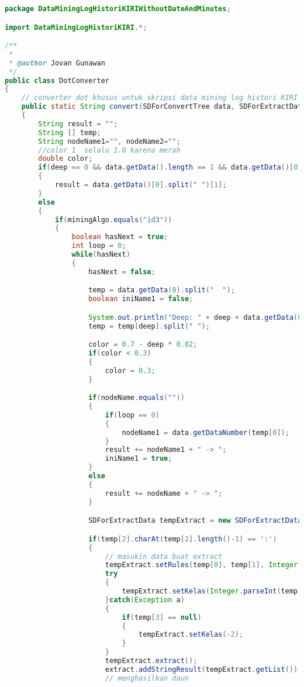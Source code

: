 \begin{lstlisting}[language=Java,basicstyle=\tiny,caption=DotConverter.java]
package DataMiningLogHistoriKIRIWithoutDateAndMinutes;

import DataMiningLogHistoriKIRI.*;

/**
 *
 * @author Jovan Gunawan
 */
public class DotConverter 
{
    // converter dot khusus untuk skripsi data mining log histori KIRI --> output berupa tree dalam string dari weka
    public static String convert(SDForConvertTree data, SDForExtractData extract, String miningAlgo, int deep, String nodeName)
    {
        String result = "";
        String [] temp;
        String nodeName1="", nodeName2="";
        //color 1  selalu 1.0 karena merah
        double color; 
        if(deep == 0 && data.getData().length == 1 && data.getData()[0].charAt(0) == ':')
        {
            result = data.getData()[0].split(" ")[1];
        }
        else
        {
            if(miningAlgo.equals("id3"))
            {
                boolean hasNext = true;
                int loop = 0;
                while(hasNext)
                {
                    hasNext = false;

                    temp = data.getData(0).split("  ");
                    boolean iniName1 = false;

                    System.out.println("Deep: " + deep + data.getData(0));
                    temp = temp[deep].split(" ");

                    color = 0.7 - deep * 0.02;
                    if(color < 0.3)
                    {
                        color = 0.3;
                    }

                    if(nodeName.equals(""))
                    {
                        if(loop == 0)
                        {
                            nodeName1 = data.getDataNumber(temp[0]);
                        }
                        result += nodeName1 + " -> ";
                        iniName1 = true;
                    }
                    else
                    {
                        result += nodeName + " -> ";
                    }

                    SDForExtractData tempExtract = new SDForExtractData(extract);

                    if(temp[2].charAt(temp[2].length()-1) == ':')
                    {
                        // masukin data buat extract
                        tempExtract.setRules(temp[0], temp[1], Integer.parseInt(temp[2].substring(0, temp[2].length()-1)));
                        try
                        {
                            tempExtract.setKelas(Integer.parseInt(temp[3]));
                        }catch(Exception a)
                        {
                            if(temp[3] == null)
                            {
                                tempExtract.setKelas(-2);
                            }
                        }
                        tempExtract.extract();
                        extract.addStringResult(tempExtract.getList());
                        // menghasilkan daun


\end{lstlisting}
